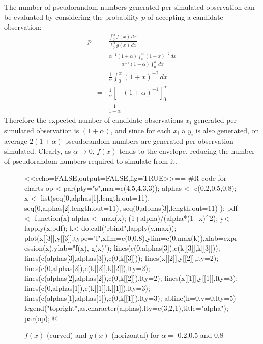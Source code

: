 The number of pseudorandom numbers generated per simulated observation
can be evaluated by considering the probability $p$ of accepting a
candidate observation:
\begin{eqnarray*}
 p & = &  \frac{\int_0^\alpha \! f(x) \, dx}{\int_0^\alpha \! g(x) \, dx}\\
   & = &  \frac{\alpha^{-1}(1+\alpha) \int_0^\alpha \! (1+x)^{-2} \, dx}
               {\alpha^{-1}(1+\alpha)\int_0^\alpha \!  \, dx} \\
   & = &  \frac{1}{\alpha} \int_0^\alpha \! (1+x)^{-2} \, dx\\
   & = &  \frac{1}{\alpha}\left[-(1+\alpha)^{-1} \right]^\alpha_0 \\
   & = &  \frac{1}{1+\alpha}
\end{eqnarray*}
Therefore the expected number of candidate observations $x_i$ generated per
simulated observation is $(1+\alpha)$, and since for each $x_i$ a
$y_i$ is also generated, on average $2(1+\alpha)$ pseudorandom numbers
are generated per observation simulated. Clearly, as $\alpha \rightarrow
0$, $f(x)$ tends to the envelope, reducing the number of
pseudorandom numbers required to simulate from it.

\begin{figure}[h]
\begin{center}
<<echo=FALSE,output=FALSE,fig=TRUE>>==
#R code for charts
op <-par(pty="s",mar=c(4.5,4,3,3));
alphas <- c(0.2,0.5,0.8);
x <- list(seq(0,alphas[1],length.out=11),
          seq(0,alphas[2],length.out=11),
          seq(0,alphas[3],length.out=11)
          );
pdf <- function(x) {
    alpha <- max(x);
    (1+alpha)/(alpha*(1+x)^2);
}
y<-lapply(x,pdf);
k<-do.call("rbind",lapply(y,max));
plot(x[[3]],y[[3]],type="l",xlim=c(0,0.8),ylim=c(0,max(k)),xlab=expression(x),ylab="f(x), g(x)");
lines(c(0,alphas[3]),c(k[[3]],k[[3]])); lines(c(alphas[3],alphas[3]),c(0,k[[3]]));
lines(x[[2]],y[[2]],lty=2);
lines(c(0,alphas[2]),c(k[[2]],k[[2]]),lty=2); lines(c(alphas[2],alphas[2]),c(0,k[[2]]),lty=2);
lines(x[[1]],y[[1]],lty=3);
lines(c(0,alphas[1]),c(k[[1]],k[[1]]),lty=3); lines(c(alphas[1],alphas[1]),c(0,k[[1]]),lty=3);
abline(h=0,v=0,lty=5)
legend("topright",as.character(alphas),lty=c(3,2,1),title="alpha");
par(op);
@
\caption{$f(x)$ (curved) and $g(x)$ (horizontal) for $\alpha=$ 0.2,0.5
and 0.8}
\end{center}
\end{figure}


